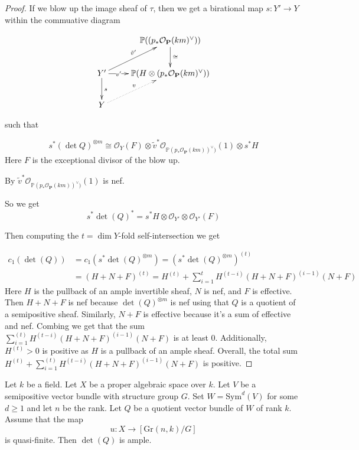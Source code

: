 \begin{proof}
If we blow up the image sheaf of $\tau$, then we get a birational map $s:Y'\to Y$ within the commuative diagram
 
$$\xymatrix{
&\mathbb{P}((p_*\mathcal{O}_{\mathbf{P}}(km)^{\vee})) \ar[d]^{\cong}\\
Y'  \ar[r]|-{v'} \ar[ru]^{\tilde{v}'} \ar[d]^s &\mathbb{P}(H\otimes (p_*\mathcal{O}_{\mathbf{P}}(km)^{\vee})) \\
Y \ar@{.>}[ru]^v &
}$$ 

such that 

$$s^*(\det Q)^{\otimes m}\cong \mathcal{O}_Y(F)\otimes \tilde{v}^*\mathcal{O}_{\mathbb{P}(p_*\mathcal{O}_{\mathbf{P}}(km))^{\vee})}(1)\otimes s^*H$$  Here $F$ is the exceptional divisor of the blow up.

By  $\tilde{v}^*\mathcal{O}_{\mathbb{P}(p_*\mathcal{O}_{\mathbf{P}}(km))^{\vee})}(1)$ is nef. 
  
So we get   
$$s^*\det(Q)^*=s^*H\otimes \mathcal{O}_{Y'}\otimes \mathcal{O}_{Y'}(F)$$   

Then computing the $t=\dim Y$-fold self-intersection we get 

\begin{align*}
c_1(\det(Q)) & =c_1(s^*\det(Q)^{\otimes m})=(s^*\det(Q)^{\otimes m})^{(t)}\\ & =(H+N+F)^{(t)}=H^{(t)}+\sum\limits_{i=1}^{t} H^{(t-i)}(H+N+F)^{(i-1)}(N+F)
\end{align*} 
 Here $H$ is the pullback of an ample invertible sheaf, $N$ is nef, and $F$ is effective. Then $H+N+F$ is nef because $\det(Q)^{\otimes m}$ is nef using that $Q$ is a quotient of a semipositive sheaf.  Similarly, $N+F$ is effective because it's a sum of effective and nef. Combing we get that the sum $\sum\limits_{i=1}^{(t)} H^{(t-i)}(H+N+F)^{(i-1)}(N+F)$ is at least 0. Additionally, $H^{(t)}>0$ is positive as $H$ is a pullback of an ample sheaf. Overall, the total sum $H^{(t)}+\sum\limits_{i=1}^{(t)} H^{(t-i)}(H+N+F)^{(i-1)}(N+F)$ is positive. 


\end{proof}

\begin{lemma}
Let $k$ be a field.
Let $X$ be a proper algebraic space over $k$.
Let $V$ be a semipositive vector bundle with structure group $G$.
Set $W = \mathrm{Sym}^d(V)$ for some $d \geq 1$ and let $n$ be the rank.
Let $Q$ be a quotient vector bundle of $W$ of rank $k$.
Assume that the map
$$
u : X \to [\mathrm{Gr}(n,k)/G]
$$
is quasi-finite.
Then $\det(Q)$ is ample.
\end{lemma}

